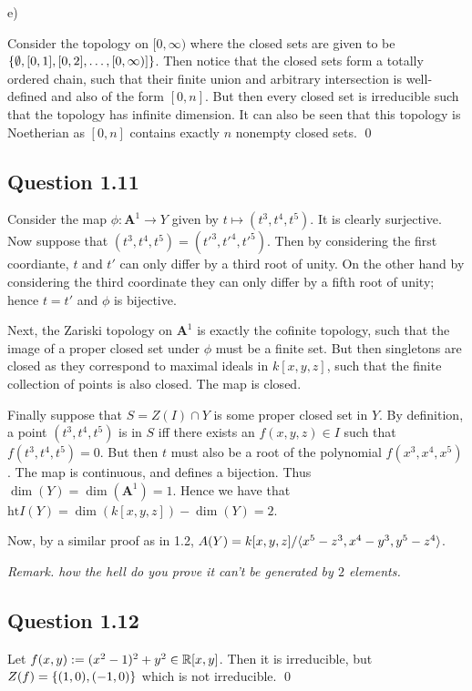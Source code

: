 \documentclass{article}
\begin{document}
\noindent e)

Consider the topology on $[0, \infty)$ where the closed sets are given to be $\{\emptyset, [0,1], [0,2], \dots, [0,\infty)]\}$. Then notice that the closed sets form a totally ordered chain, such that their finite union and arbitrary intersection is well-defined and also of the form $[0,n]$. But then every closed set is irreducible such that the topology has infinite dimension. It can also be seen that this topology is Noetherian as $[0,n]$ contains exactly $n$ nonempty closed sets. \qed
\lspace

\subsection*{Question 1.11}

Consider the map $\phi: \mathbf{A}^1 \to Y$ given by $t \mapsto (t^3, t^4, t^5)$. It is clearly surjective. Now suppose that $(t^3,t^4,t^5) = (t'^3,t'^4,t'^5)$. Then by considering the first coordiante, $t$ and $t'$ can only differ by a third root of unity. On the other hand by considering the third coordinate they can only differ by a fifth root of unity; hence $t = t'$ and $\phi$ is bijective.

Next, the Zariski topology on $\mathbf{A}^1$ is exactly the cofinite topology, such that the image of a proper closed set under $\phi$ must be a finite set. But then singletons are closed as they correspond to maximal ideals in $k[x,y,z]$, such that the finite collection of points is also closed. The map is closed.

Finally suppose that $S = Z(I) \cap Y$ is some proper closed set in $Y$. By definition, a point $(t^3,t^4,t^5)$ is in $S$ iff there exists an $f(x,y,z) \in I$ such that $f(t^3,t^4,t^5) = 0$. But then $t$ must also be a root of the polynomial $f(x^3,x^4,x^5)$. The map is continuous, and defines a bijection. Thus $\dim(Y) = \dim(\mathbf{A}^1) = 1$. Hence we have that $\text{ht}I(Y) = \dim(k[x,y,z]) - \dim(Y) = 2$.

Now, by a similar proof as in 1.2, $A(Y) = k[x,y,z]/\langle x^5-z^3, x^4-y^3, y^5-z^4\rangle$.
\lspace

\noindent \textit{Remark. how the hell do you prove it can't be generated by $2$ elements.}

\subsection*{Question 1.12}

Let $f(x,y) := (x^2-1)^2 + y^2 \in \mathbb R[x,y]$. Then it is irreducible, but $Z(f) = \{(1,0), (-1,0)\}$ which is not irreducible. \qed
\end{document}
